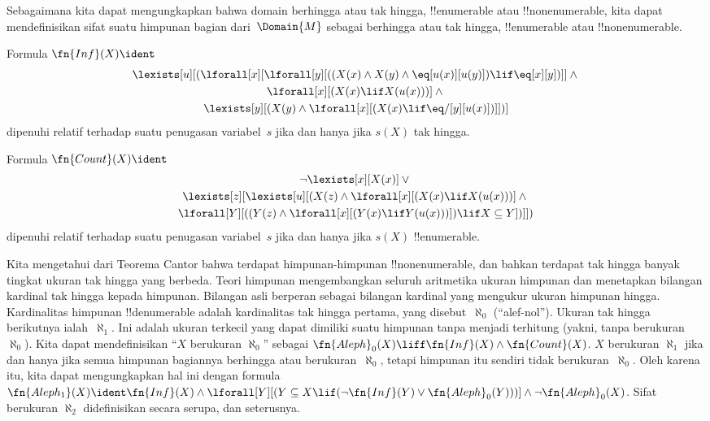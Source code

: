 \documentclass[../../../include/open-logic-section]{subfiles}
\begin{document}


\begin{explain}
Sebagaimana kita dapat mengungkapkan bahwa domain berhingga atau tak hingga,
!!{enumerable} atau !!{nonenumerable}, kita dapat mendefinisikan sifat suatu
himpunan bagian dari~$\Domain{M}$ sebagai berhingga atau tak hingga,
!!{enumerable} atau !!{nonenumerable}.
\end{explain}

\begin{prop}
Formula $\fn{Inf}(X) \ident$
\begin{multline*}
\lexists[u][(\lforall[x][\lforall[y][((X(x) \land X(y) \land
      \eq[u(x)][u(y)]) \lif \eq[x][y])]] \land {}
      \\ \lforall[x][(X(x) \lif X(u(x)))] \land {}
      \\\lexists[y][(X(y) \land \lforall[x][(X(x) \lif \eq/[y][u(x)])]])]
\end{multline*}
dipenuhi relatif terhadap suatu penugasan variabel~$s$ jika dan hanya jika
$s(X)$ tak hingga.
\end{prop}

\begin{prop}
Formula $\fn{Count}(X) \ident $
\begin{multline*}
\lnot\lexists[x][X(x)] \lor {} \\
\lexists[z][\lexists[u][(X(z) \land
    \lforall[x][(X(x) \lif X(u(x)))] \land {} \\ \lforall[Y][((Y(z) \land
      \lforall[x][(Y(x) \lif Y(u(x)))]) \lif X \subseteq Y])]])
\end{multline*}
dipenuhi relatif terhadap suatu penugasan variabel~$s$ jika dan hanya jika
$s(X)$ !!{enumerable}.
\end{prop}

Kita mengetahui dari Teorema Cantor bahwa terdapat himpunan-himpunan
!!{nonenumerable}, dan bahkan terdapat tak hingga banyak tingkat ukuran tak
hingga yang berbeda. Teori himpunan mengembangkan seluruh aritmetika
ukuran himpunan dan menetapkan bilangan kardinal tak hingga kepada himpunan.
Bilangan asli berperan sebagai bilangan kardinal yang mengukur ukuran
himpunan hingga. Kardinalitas himpunan !!{denumerable} adalah kardinalitas
tak hingga pertama, yang disebut~$\aleph_0$ (``alef-nol''). Ukuran tak hingga
berikutnya ialah~$\aleph_1$. Ini adalah ukuran terkecil yang dapat dimiliki
suatu himpunan tanpa menjadi terhitung (yakni, tanpa berukuran~$\aleph_0$).
Kita dapat mendefinisikan ``$X$ berukuran $\aleph_0$'' sebagai
$\fn{Aleph}_0(X) \liff \fn{Inf}(X) \land \fn{Count}(X)$. $X$ berukuran
$\aleph_1$ jika dan hanya jika semua himpunan bagiannya berhingga atau
berukuran~$\aleph_0$, tetapi himpunan itu sendiri tidak
berukuran~$\aleph_0$. Oleh karena itu, kita dapat mengungkapkan hal ini dengan
formula
$\fn{Aleph_1}(X) \ident \fn{Inf}(X) \land
  \lforall[Y][(Y \subseteq X \lif
  (\lnot\fn{Inf}(Y) \lor \fn{Aleph}_0(Y)))] \land \lnot
\fn{Aleph}_0(X)$. Sifat berukuran $\aleph_2$ didefinisikan secara serupa,
dan seterusnya.
\end{document}
